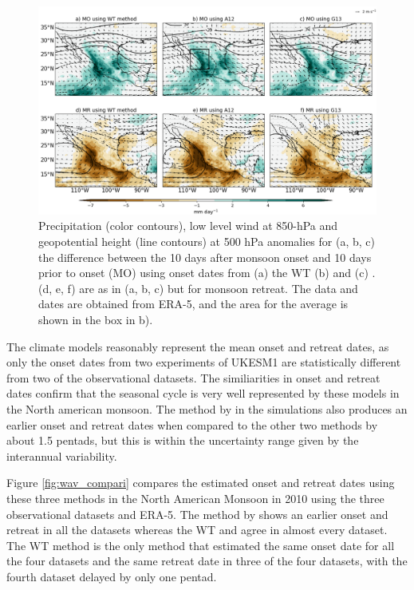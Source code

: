\begin{figure}[t!]
\centering
 \includegraphics[width=\linewidth]{figures/wav_fig6.png}
\caption[Precipitation anomalies during North American monsoon onset]{  Precipitation (color contours), low level wind at 850-hPa and geopotential height (line contours) at 500 hPa anomalies for (a, b, c) the difference between the 10 days after monsoon onset and 10 days prior to onset (MO) using onset dates from (a) the WT (b) \cite{arias2012} and (c) \cite{geil2013}. (d, e, f) are as in (a, b, c) but for monsoon retreat. The data and dates are obtained from ERA-5, and the area for the average is shown in the box in b). }
\label{fig:wav_fig6}
\end{figure}

The climate models reasonably represent the mean onset and retreat dates, as only the onset dates from two experiments of UKESM1 are statistically different from two of the observational datasets. The similiarities in onset and retreat dates confirm that the seasonal cycle is very well represented by these models in the North american monsoon. The method by  in the simulations also produces an earlier onset and retreat dates when compared to the other two methods by about 1.5 pentads, but this is within the uncertainty range given by the interannual variability.  

Figure \ref{fig:wav_compari} compares the estimated onset and retreat dates using these three methods in the North American Monsoon in 2010 using the three observational datasets and ERA-5. The method by  shows an earlier onset and retreat in all the datasets whereas the WT and  agree in almost every dataset. The WT method is the only method that estimated the same onset date for all the four datasets and the same retreat date in three of the four datasets, with the fourth dataset delayed by only one pentad. 

